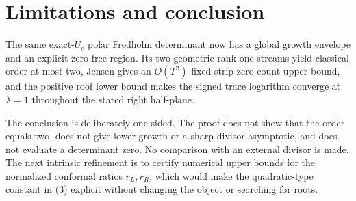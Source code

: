 \section{Limitations and conclusion}
The same exact-\(U_c\) polar Fredholm determinant now has a global growth
envelope and an explicit zero-free region. Its two geometric rank-one
streams yield classical order at most two, Jensen gives an \(O(T^2)\)
fixed-strip zero-count upper bound, and the positive roof lower bound makes
the signed trace logarithm converge at \(\lambda=1\) throughout the stated
right half-plane.

The conclusion is deliberately one-sided. The proof does not show that the
order equals two, does not give lower growth or a sharp divisor asymptotic,
and does not evaluate a determinant zero. No comparison with an external
divisor is made. The next intrinsic refinement is to certify numerical upper
bounds for the normalized conformal ratios \(r_L,r_R\), which would make the
quadratic-type constant in (3) explicit without changing the object or
searching for roots.
